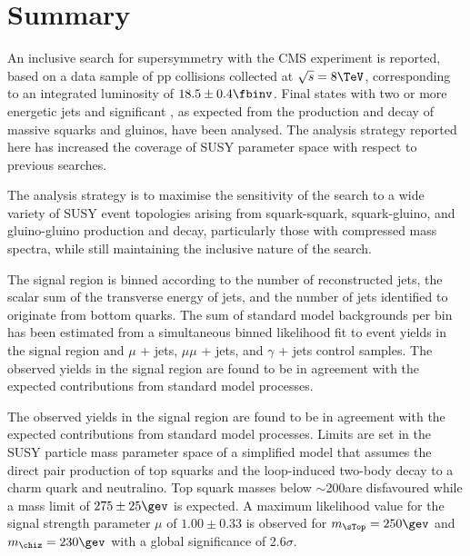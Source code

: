 \clearpage
\section{Summary\label{sec:conclusions}}

An inclusive search for supersymmetry with the CMS experiment is
reported, based on a data sample of pp collisions collected at
$\sqrt{s} = 8\TeV$, corresponding to an integrated luminosity of $18.5
\pm 0.4 \fbinv$.  Final states with two or more energetic jets and
significant \met, as expected from the production and decay of massive
squarks and gluinos, have been analysed. The analysis strategy
reported here has increased the coverage of SUSY parameter space with
respect to previous searches.

The analysis strategy is to maximise the sensitivity of the search to
a wide variety of SUSY event topologies arising from squark-squark,
squark-gluino, and gluino-gluino production and decay, particularly
those with compressed mass spectra, while still maintaining the
inclusive nature of the search.

The signal region is binned according to the number of reconstructed
jets, the scalar sum of the transverse energy of jets, and the number
of jets identified to originate from bottom quarks. The sum of
standard model backgrounds per bin has been estimated from a
simultaneous binned likelihood fit to event yields in the signal
region and $\mu$ + jets, $\mu\mu$ + jets, and $\gamma$ + jets control
samples. The observed yields in the signal region are found to be in
agreement with the expected contributions from standard model
processes.  

The observed yields in the signal region are found to be in agreement
with the expected contributions from standard model processes. Limits
are set in the SUSY particle mass parameter space of a simplified
model that assumes the direct pair production of top squarks and the
loop-induced two-body decay to a charm quark and neutralino. Top
squark masses below $\sim$200\gev are disfavoured while a mass limit
of $275 \pm 25 \gev$ is expected. A maximum likelihood value for the
signal strength parameter $\mu$ of $1.00 \pm 0.33$ is observed for
$m_{\sTop} = 250\gev$ and $m_{\chiz} = 230\gev$ with a global
significance of 2.6$\sigma$. 

